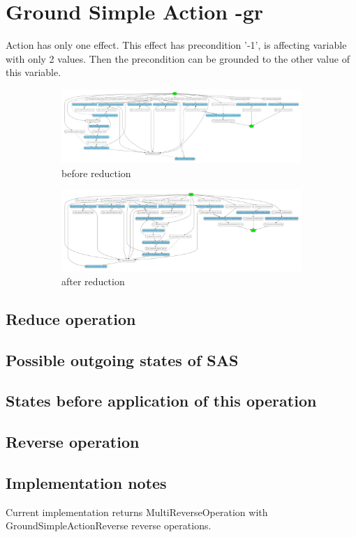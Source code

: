 \chapter{Ground Simple Action -gr}

	Action has only one effect. This effect has precondition '-1', is affecting variable with only 2 values. Then the precondition can be grounded to the other value of this variable.

	\begin{figure}
		\begin{subfigure}[b]{0.8\textwidth}
			\includegraphics[width=\linewidth]{groundSimpleAction/figures/groundSimpleAction_input}
			\caption{before reduction}
		\end{subfigure}	
		
		\begin{subfigure}[b]{0.8\textwidth}
			\includegraphics[width=\linewidth]{groundSimpleAction/figures/groundSimpleAction_output}
			\caption{after reduction}
		\end{subfigure}
		\caption{ }
	\end{figure}               
	
	
	\section{Reduce operation}
	
	\section{Possible outgoing states of SAS}
	\section{States before application of this operation}
	\section{Reverse operation}
	
	
	\section{Implementation notes}
	Current implementation returns MultiReverseOperation with GroundSimpleActionReverse reverse operations.
